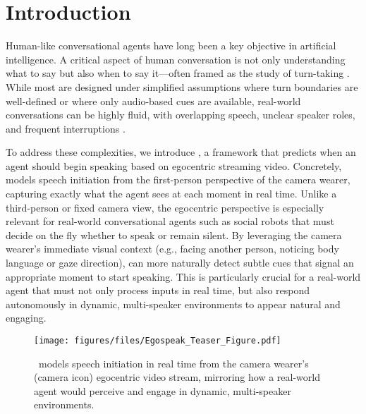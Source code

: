 
\section{Introduction}\label{sec:introduction}

Human-like conversational agents have long been a key objective in artificial intelligence. A critical aspect of human conversation is not only understanding what to say but also when to say it—often framed as the study of turn-taking \cite{duncan1972some}. While most are designed under simplified assumptions where turn boundaries are well-defined or where only audio-based cues are available, real-world conversations can be highly fluid, with overlapping speech, unclear speaker roles, and frequent interruptions \cite{skantze2017towards, skantze2021turnreview}.

To address these complexities, we introduce \frameworkname, a framework that predicts when an agent should begin speaking based on egocentric streaming video. Concretely, \frameworkname models speech initiation from the first-person perspective of the camera wearer, capturing exactly what the agent sees at each moment in real time. 
Unlike a third-person or fixed camera view, the egocentric perspective is especially relevant 
for real-world conversational agents such as social robots that must decide on the fly whether to speak or remain silent. By leveraging the camera wearer’s immediate visual context (e.g., facing another person, noticing body language or gaze direction), \frameworkname can more naturally detect subtle cues that signal an appropriate moment to start speaking. This is particularly crucial for a real-world agent that must not only process inputs in real time, but also respond autonomously in dynamic, multi-speaker environments 
to appear natural and engaging.


\begin{figure}[t]
\centering
\texttt{[image: figures/files/Egospeak\_Teaser\_Figure.pdf]}

\caption{\frameworkname\ models speech initiation in real time from the camera wearer’s (camera icon) egocentric video stream, mirroring how a real-world agent would perceive and engage in dynamic, multi-speaker environments.}


\label{fig:new_teaser}
\vspace*{-1.5em}
\end{figure}



